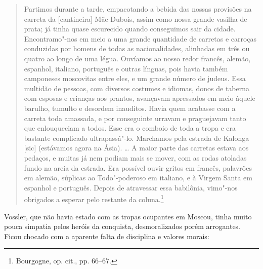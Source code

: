 \begin{quote}
Partimos durante a tarde, empacotando a bebida das nossas provisões na
carreta da {[}cantineira{]} Mãe Dubois, assim como nossa grande vasilha
de prata; já tinha quase escurecido quando conseguimos sair da cidade.
Encontramo"-nos em meio a uma grande quantidade de carretas e carroças
conduzidas por homens de todas as nacionalidades, alinhadas em três ou
quatro ao longo de uma légua. Ouvíamos ao nosso redor francês, alemão,
espanhol, italiano, português e outras línguas, pois havia também
camponeses moscovitas entre eles, e um grande número de judeus. Essa
multidão de pessoas, com diversos costumes e idiomas, donos de taberna
com esposas e crianças aos prantos, avançavam apressados em meio àquele
barulho, tumulto e desordem inauditos. Havia quem acabasse com a carreta
toda amassada, e por conseguinte urravam e praguejavam tanto que
enlouqueciam a todos. Esse era o comboio de toda a tropa e era bastante
complicado ultrapassá"-lo. Marchamos pela estrada de Kalonga {[}sic{]}
(estávamos agora na Ásia). \ldots{} A maior parte das carretas estava
aos pedaços, e muitas já nem podiam mais se mover, com as rodas atoladas
fundo na areia da estrada. Era possível ouvir gritos em francês,
palavrões em alemão, súplicas ao Todo"-poderoso em italiano, e à Virgem
Santa em espanhol e português. Depois de atravessar essa babilônia,
vimo"-nos obrigados a esperar pelo restante da coluna.\footnote{Bourgogne, op. cit., pp. 66--67.} 
\end{quote}

Vossler, que não havia estado com as tropas ocupantes em Moscou, tinha
muito pouca simpatia pelos heróis da conquista, desmoralizados porém
arrogantes. Ficou chocado com a aparente falta de disciplina e valores
morais:

